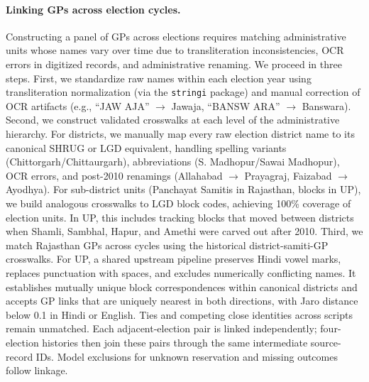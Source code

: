 \documentclass[12pt]{article}
\begin{document}
\paragraph{Linking GPs across election cycles.} Constructing a panel of GPs across elections requires matching administrative units whose names vary over time due to transliteration inconsistencies, OCR errors in digitized records, and administrative renaming. We proceed in three steps. First, we standardize raw names within each election year using transliteration normalization (via the \texttt{stringi} package) and manual correction of OCR artifacts (e.g., ``JAW AJA'' $\rightarrow$ Jawaja, ``BANSW ARA'' $\rightarrow$ Banswara). Second, we construct validated crosswalks at each level of the administrative hierarchy. For districts, we manually map every raw election district name to its canonical SHRUG or LGD equivalent, handling spelling variants (Chittorgarh/Chittaurgarh), abbreviations (S. Madhopur/Sawai Madhopur), OCR errors, and post-2010 renamings (Allahabad $\rightarrow$ Prayagraj, Faizabad $\rightarrow$ Ayodhya). For sub-district units (Panchayat Samitis in Rajasthan, blocks in UP), we build analogous crosswalks to LGD block codes, achieving 100\% coverage of election units. In UP, this includes tracking blocks that moved between districts when Shamli, Sambhal, Hapur, and Amethi were carved out after 2010. Third, we match Rajasthan GPs across cycles using the historical district-samiti-GP crosswalks. For UP, a shared upstream pipeline preserves Hindi vowel marks, replaces punctuation with spaces, and excludes numerically conflicting names. It establishes mutually unique block correspondences within canonical districts and accepts GP links that are uniquely nearest in both directions, with Jaro distance below 0.1 in Hindi or English. Ties and competing close identities across scripts remain unmatched. Each adjacent-election pair is linked independently; four-election histories then join these pairs through the same intermediate source-record IDs. Model exclusions for unknown reservation and missing outcomes follow linkage.
\end{document}

